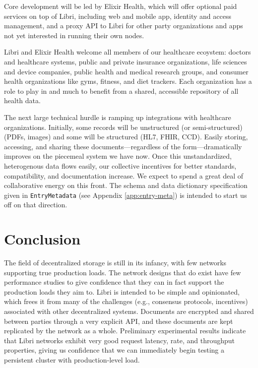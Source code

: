 \documentclass[10pt]{article}
\newcommand{\ttt}[1]{\texttt{#1}}
\begin{document}
Core development will be led by Elixir Health, which will offer optional paid services on top of Libri, including web and mobile app, identity and access management, and a proxy API to Libri for other  party organizations and apps not yet interested in running their own nodes.

Libri and Elixir Health welcome all members of our healthcare ecoystem: doctors and healthcare systems, public and private insurance organizations, life sciences and device companies, public health and medical research groups, and consumer health organizations like gyms, fitness, and diet trackers. Each organization has a role to play in and much to benefit from a shared, accessible repository of all health data.

The next large technical hurdle is ramping up integrations with healthcare organizations. Initially, some records will be unstructured (or semi-structured) (PDFs, images) and some will be structured (HL7, FHIR, CCD). Easily storing, accessing, and sharing these documents---regardless of the form---dramatically improves on the piecemeal system we have now. Once this unstandardized, heterogenous data flows easily, our collective incentives for better standards, compatibility, and documentation increase. We expect to spend a great deal of collaborative energy on this front. The schema and data dictionary specification given in \ttt{EntryMetadata} (see Appendix \ref{app:entry-meta}) is intended to start us off on that direction. 

\section{Conclusion}
The field of decentralized storage is still in its infancy, with few networks supporting true production loads. The network designs that do exist have few performance studies to give confidence that they can in fact support the production loads they aim to. Libri is intended to be simple and opinionated, which frees it from many of the challenges (e.g., consensus protocols, incentives) associated with other decentralized systems. Documents are encrypted and shared between parties through a very explicit API, and these documents are kept replicated by the network as a whole. Preliminary experimental results indicate that Libri networks exhibit very good request latency, rate, and throughput properties, giving us confidence that we can immediately begin testing a persistent cluster with production-level load. 
\end{document}
